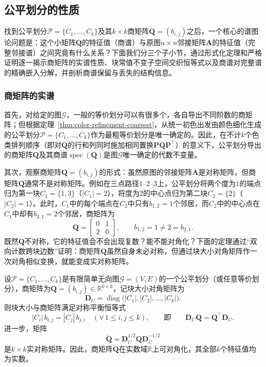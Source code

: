 \subsection{公平划分的性质}
\label{sec:adjacency-spectral-hierarchy}

找到公平划分$\mathcal P=\{C_1,\ldots,C_k\}$及其$k\times k$商矩阵$\bm Q=(b_{i,j})$之后，一个核心的谱图论问题是：这个小矩阵$\bm Q$的特征值（商谱）与原图$n\times n$邻接矩阵$\bm A$的特征值（完整邻接谱）之间究竟有什么关系？下面我们分三个子小节，通过形式化定理和严格证明逐一揭示商矩阵的实谱性质、块常值不变子空间交织恒等式以及商谱对完整谱的精确嵌入分解，并剖析商谱保留与丢失的结构信息。

\subsubsection{商矩阵的实谱}
\label{sec:adjacency-quotient-real-spectrum}

首先，对给定的图$\mathcal G$，一般的等价划分可以有很多个，各自导出不同阶数的商矩阵；但根据定理~\ref{thm:color-refinement-coarsest}，从统一初色出发由颜色细化生成的公平划分$\mathcal P=\{C_1,\ldots,C_k\}$作为最粗等价划分是唯一确定的。因此，在不计$k$个色类排列顺序（即对$\bm Q$的行和列同时施加相同置换$\bm P\bm Q\bm P^\top$）的意义下，公平划分导出的商矩阵$\bm Q$及其商谱$\operatorname{spec}(\bm Q)$是图$\mathcal G$唯一确定的代数不变量。

其次，观察商矩阵$\bm Q=(b_{i,j})$的形式：虽然原图的邻接矩阵$\bm A$是对称矩阵，但商矩阵$\bm Q$通常不是对称矩阵。例如在三点路径$1\text{--}2\text{--}3$上，公平划分将两个度为$1$的端点归为第一块$C_1=\{1,3\}$（$|C_1|=2$），将度为$2$的中心点归为第二块$C_2=\{2\}$（$|C_2|=1$）。此时，$C_1$中的每个端点在$C_2$中只有$b_{1,2}=1$个邻居，而$C_2$中的中心点在$C_1$中却有$b_{2,1}=2$个邻居，商矩阵为
\[
\bm Q=\begin{bmatrix}0&1\\2&0\end{bmatrix},\qquad b_{1,2}=1\neq 2=b_{2,1}.
\]
既然$\bm Q$不对称，它的特征值会不会出现复数？能不能对角化？下面的定理通过“双向计数跨块边数”证明：商矩阵$\bm Q$虽然自身未必对称，但通过块大小对角矩阵作一次对角相似变换，就能变成实对称矩阵。

\begin{theorem}[商矩阵的实谱性质]
\label{thm:quotient-matrix-real-spectrum}
设$\mathcal P=\{C_1,\ldots,C_k\}$是有限简单无向图$\mathcal G=(V,E)$的一个公平划分（或任意等价划分），商矩阵为$\bm Q=(b_{i,j})\in\mathbb R^{k\times k}$，记块大小对角矩阵为
\[
\bm D_C=\operatorname{diag}\bigl(|C_1|,|C_2|,\ldots,|C_k|\bigr).
\]
则块大小与商矩阵满足对称平衡恒等式
\begin{equation}
|C_i|\,b_{i,j}=|C_j|\,b_{j,i}\quad(\forall\,1\leq i,j\leq k),
\qquad\text{即}\qquad
\bm D_C\bm Q=\bm Q^\top\bm D_C.
\label{eq:adjacency-quotient-symmetry}
\end{equation}
进一步，矩阵
\[
\widetilde{\bm Q}=\bm D_C^{1/2}\bm Q\bm D_C^{-1/2}
\]
是$k\times k$实对称矩阵。因此，商矩阵$\bm Q$在实数域$\mathbb R$上可对角化，其全部$k$个特征值均为实数。
\end{theorem}


